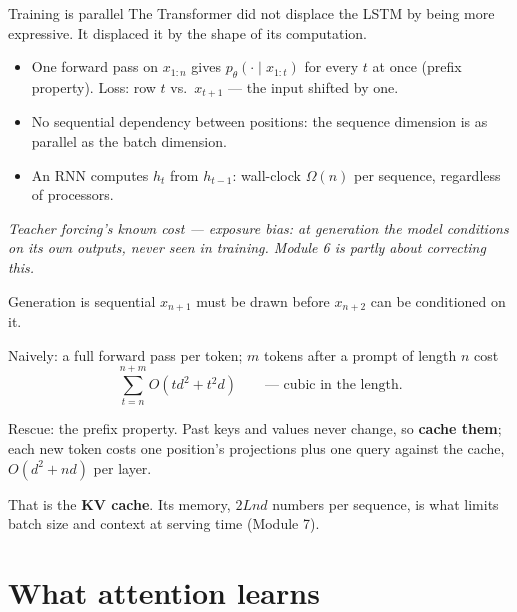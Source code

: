 \documentclass[11pt,aspectratio=169]{beamer}
\newcommand{\ptheta}{p_{\theta}}
\newcommand{\dest}[1]{\textcolor{structure}{\textbf{#1}}}
\newcommand{\hook}[1]{{\small\textcolor{gray!60!black}{\textit{#1}}}}
\begin{document}
\begin{frame}{Training is parallel}
  The Transformer did not displace the LSTM by being more expressive. It displaced it by
  the shape of its computation.

  \vspace{0.8em}
  \begin{itemize}
    \item One forward pass on $x_{1:n}$ gives $\ptheta(\cdot\mid x_{1:t})$ for every $t$ at
          once (prefix property). Loss: row $t$ vs.\ $x_{t+1}$ --- the input shifted by one.
    \item No sequential dependency between positions: the sequence dimension is as parallel
          as the batch dimension.
    \item An RNN computes $h_t$ from $h_{t-1}$: wall-clock $\Omega(n)$ per sequence,
          regardless of processors.
  \end{itemize}

  \vspace{0.6em}
  \hook{Teacher forcing's known cost --- exposure bias: at generation the model conditions
  on its own outputs, never seen in training. Module 6 is partly about correcting this.}
\end{frame}

\begin{frame}{Generation is sequential}
  $x_{n+1}$ must be drawn before $x_{n+2}$ can be conditioned on it.

  \vspace{0.6em}
  Naively: a full forward pass per token; $m$ tokens after a prompt of length $n$ cost
  \[
    \sum_{t=n}^{n+m} O(td^2 + t^2d)\qquad\text{--- cubic in the length.}
  \]

  \vspace{0.6em}
  Rescue: the prefix property. Past keys and values never change, so \dest{cache them};
  each new token costs one position's projections plus one query against the cache,
  $O(d^2 + nd)$ per layer.

  \vspace{0.8em}
  That is the \dest{KV cache}. Its memory, $2Lnd$ numbers per sequence, is what limits
  batch size and context at serving time (Module 7).
\end{frame}

\section{What attention learns}
\end{document}
